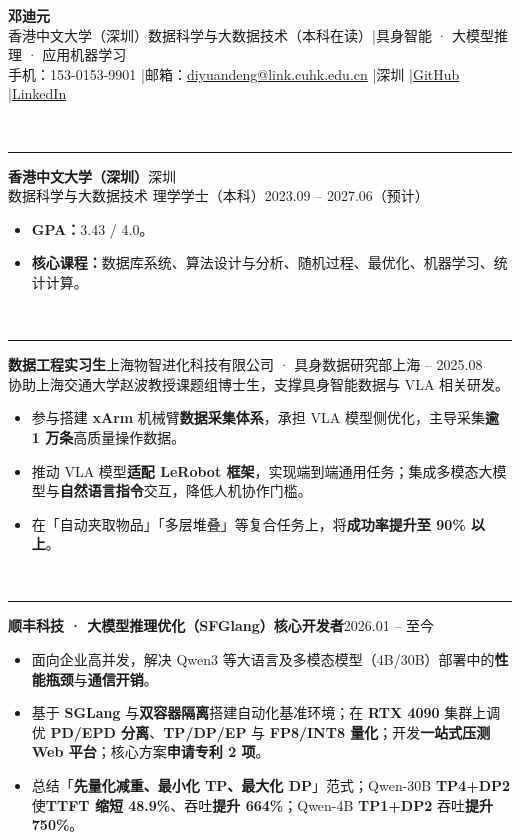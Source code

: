 \documentclass[10pt,letterpaper]{article}
\newcommand{\Github}{https://github.com/aCm1T}
\newcommand{\LinkedIn}{https://www.linkedin.com/in/diyuandeng/}
\newcommand{\cvsec}[1]{%
  \par\addvspace{0.36em}%
  \noindent{\large\bfseries #1}\\[-0.22em]%
  {\color{black!45}\rule{\linewidth}{0.4pt}}%
  \par\addvspace{0.16em}%
}
\begin{document}
\raggedright

\begin{center}
  {\LARGE\bfseries 邓迪元}\\[0.12em]
  {\small 香港中文大学（深圳）\quad 数据科学与大数据技术（本科在读）\quad|\quad 具身智能 · 大模型推理 · 应用机器学习}\\[0.18em]
  \footnotesize
  手机：153-0153-9901 \quad|\quad 邮箱：\href{mailto:diyuandeng@link.cuhk.edu.cn}{diyuandeng@link.cuhk.edu.cn} \quad|\quad 深圳 \quad|\quad \href{\Github}{GitHub} \quad|\quad \href{\LinkedIn}{LinkedIn}
\end{center}
\vspace{0.06em}

\cvsec{教育经历}
\textbf{香港中文大学（深圳）}\hfill{\normalsize 深圳}\\
数据科学与大数据技术 \quad 理学学士（本科）\hfill{\normalsize 2023.09 -- 2027.06（预计）}
\begin{itemize}
  \item \textbf{GPA：}3.43 / 4.0。
  \item \textbf{核心课程：}数据库系统、算法设计与分析、随机过程、最优化、机器学习、统计计算。
\end{itemize}

\cvsec{实习经历}
\textbf{数据工程实习生}\quad 上海物智进化科技有限公司 · 具身数据研究部\hfill{\normalsize 上海 -- 2025.08}\\
协助上海交通大学赵波教授课题组博士生，支撑具身智能数据与 VLA 相关研发。
\begin{itemize}
  \item 参与搭建 \textbf{xArm} 机械臂\textbf{数据采集体系}，承担 VLA 模型侧优化，主导采集\textbf{逾 1 万条}高质量操作数据。
  \item 推动 VLA 模型\textbf{适配 LeRobot 框架}，实现端到端通用任务；集成多模态大模型与\textbf{自然语言指令}交互，降低人机协作门槛。
  \item 在「自动夹取物品」「多层堆叠」等复合任务上，将\textbf{成功率提升至 90\% 以上}。
\end{itemize}

\cvsec{项目与研究}
\textbf{顺丰科技 · 大模型推理优化（SFGlang）}\quad\textbf{核心开发者}\hfill{\normalsize 2026.01 -- 至今}
\begin{itemize}
  \item 面向企业高并发，解决 Qwen3 等大语言及多模态模型（4B/30B）部署中的\textbf{性能瓶颈}与\textbf{通信开销}。
  \item 基于 \textbf{SGLang} 与\textbf{双容器隔离}搭建自动化基准环境；在 \textbf{RTX 4090} 集群上调优 \textbf{PD/EPD 分离}、\textbf{TP/DP/EP} 与 \textbf{FP8/INT8 量化}；开发\textbf{一站式压测 Web 平台}；核心方案\textbf{申请专利 2 项}。
  \item 总结「\textbf{先量化减重、最小化 TP、最大化 DP}」范式；Qwen-30B \textbf{TP4+DP2} 使\textbf{TTFT 缩短 48.9\%}、吞吐\textbf{提升 664\%}；Qwen-4B \textbf{TP1+DP2} 吞吐\textbf{提升 750\%}。
\end{itemize}
\end{document}
